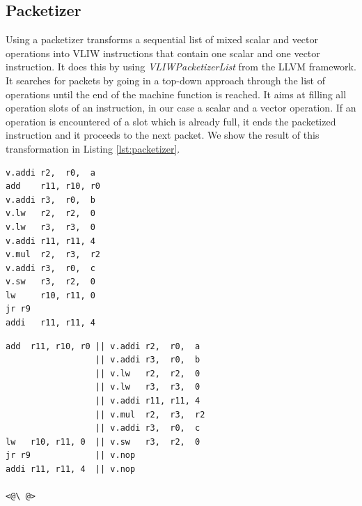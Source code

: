 \subsection{Packetizer}
Using a packetizer transforms a sequential list of mixed scalar and vector operations into VLIW instructions that contain one scalar and one vector instruction. It does this by using \emph{VLIWPacketizerList} from the LLVM framework. %
It searches for packets by going in a top-down approach through the list of operations until the end of the machine function is reached. It aims at filling all operation slots of an instruction, in our case a scalar and a vector operation. If an operation is encountered of a slot which is already full, it ends the packetized instruction and it proceeds to the next packet. 
We show the result of this transformation in Listing \ref{lst:packetizer}. 

\label{lst:packetizer}
\begin{center}
\hspace{2px}\begin{minipage}{.45\textwidth}
\begin{lstlisting}[frame=tlrb]
v.addi r2,  r0,  a
add    r11, r10, r0
v.addi r3,  r0,  b
v.lw   r2,  r2,  0
v.lw   r3,  r3,  0
v.addi r11, r11, 4
v.mul  r2,  r3,  r2
v.addi r3,  r0,  c
v.sw   r3,  r2,  0
lw     r10, r11, 0
jr r9
addi   r11, r11, 4
\end{lstlisting}
\end{minipage}\hfill
\begin{minipage}{.5\textwidth}
\begin{lstlisting}[frame=tlrb]
add  r11, r10, r0 || v.addi r2,  r0,  a
                  || v.addi r3,  r0,  b
                  || v.lw   r2,  r2,  0
                  || v.lw   r3,  r3,  0
                  || v.addi r11, r11, 4
                  || v.mul  r2,  r3,  r2
                  || v.addi r3,  r0,  c
lw   r10, r11, 0  || v.sw   r3,  r2,  0
jr r9             || v.nop
addi r11, r11, 4  || v.nop

<@\ @>
\end{lstlisting}
\end{minipage}
\end{center}

